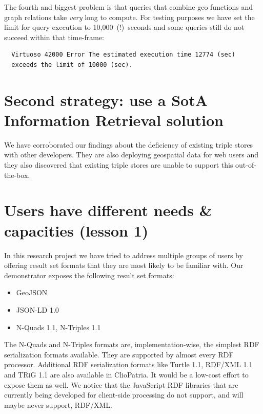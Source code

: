 \documentclass[a4paper]{scrartcl}
\begin{document}
The fourth and biggest problem is that queries that combine geo
functions and graph relations take \emph{very} long to compute.  For
testing purposes we have set the limit for query execution to
10,000~(!)~seconds and some queries still do not succeed within that
time-frame:

\begin{verbatim}
  Virtuoso 42000 Error The estimated execution time 12774 (sec)
  exceeds the limit of 10000 (sec).
\end{verbatim}


\section{Second strategy: use a SotA Information Retrieval solution}

We have corroborated our findings about the deficiency of existing
triple stores with other developers.  They are also deploying
geospatial data for web users and they also discovered that existing
triple stores are unable to support this out-of-the-box.


\section{Users have different needs \& capacities (lesson 1)}

In this research project we have tried to address multiple groups of
users by offering result set formats that they are most likely to be
familiar with.  Our demonstrator exposes the following result set
formats:

\begin{itemize}

\item GeoJSON

\item JSON-LD 1.0

\item N-Quads 1.1, N-Triples 1.1

\end{itemize}

The N-Quads and N-Triples formats are, implementation-wise, the
simplest RDF serialization formats available.  They are supported by
almost every RDF processor.  Additional RDF serialization formats like
Turtle 1.1, RDF/XML 1.1 and TRiG 1.1 are also available in ClioPatria.
It would be a low-cost effort to expose them as well.  We notice that
the JavaScript RDF libraries that are currently being developed for
client-side processing do not support, and will maybe never support,
RDF/XML.
\end{document}
